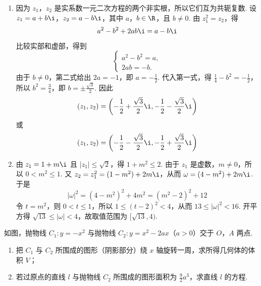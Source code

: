 \documentclass[UTF8,a4paper,oneside,11pt]{ctexbook}
\begin{document}
\begin{solution}
\begin{enumerate}
\item 因为 \(z_1\)，\(z_2\) 是实系数一元二次方程的两个非实根，所以它们互为共轭复数. 设 \(z_1=a+b\i\)，\(z_2=a-b\i\)，其中 \(a\)，\(b\in\R\)，且 \(b\neq0\). 由 \(z_1^2=z_2\)，得
\[
a^2-b^2+2ab\i=a-b\i
\]
比较实部和虚部，得到
\[
\begin{cases}
a^2-b^2=a,\\
2ab=-b.
\end{cases}
\]
由于 \(b\neq0\)，第二式给出 \(2a=-1\)，即 \(a=-\frac12\). 代入第一式，得 \(\frac14-b^2=-\frac12\)，所以 \(b^2=\frac34\)，即 \(b=\pm\frac{\sqrt3}{2}\). 因此
\[
(z_1,z_2)=\left(-\frac12+\frac{\sqrt3}{2}\i,-\frac12-\frac{\sqrt3}{2}\i\right)
\]
或
\[
(z_1,z_2)=\left(-\frac12-\frac{\sqrt3}{2}\i,-\frac12+\frac{\sqrt3}{2}\i\right)
\]
\item 由 \(z_1=1+m\i\) 且 \(|z_1|\leqslant\sqrt2\)，得 \(1+m^2\leqslant2\). 由于 \(z_1\) 是虚数，\(m\neq0\)，所以 \(0<m^2\leqslant1\). 又 \(z_2=z_1^2=(1-m^2)+2m\i\)，从而 \(\omega=(4-m^2)+2m\i\). 于是
\[
|\omega|^2=(4-m^2)^2+4m^2=(m^2-2)^2+12
\]
令 \(t=m^2\)，则 \(0<t\leqslant1\)，所以 \(1\leqslant(t-2)^2<4\)，从而 \(13\leqslant|\omega|^2<16\). 开平方得 \(\sqrt{13}\leqslant|\omega|<4\)，故取值范围为 \([\sqrt{13},4)\).
\end{enumerate}
\end{solution}

\reuseproblemnumber
\begin{problem}[B]
如图，抛物线 \(C_1:y=-x^2\) 与抛物线 \(C_2:y=x^2-2ax\)（\(a>0\)）交于 \(O\)，\(A\) 两点.

\begin{enumerate}
\item 把 \(C_1\) 与 \(C_2\) 所围成的图形（阴影部分）绕 \(x\) 轴旋转一周，求所得几何体的体积 \(V\)；
\item 若过原点的直线 \(l\) 与抛物线 \(C_2\) 所围成的图形面积为 \(\frac{9}{2}a^{3}\)，求直线 \(l\) 的方程.
\end{enumerate}

\end{problem}
\end{document}
